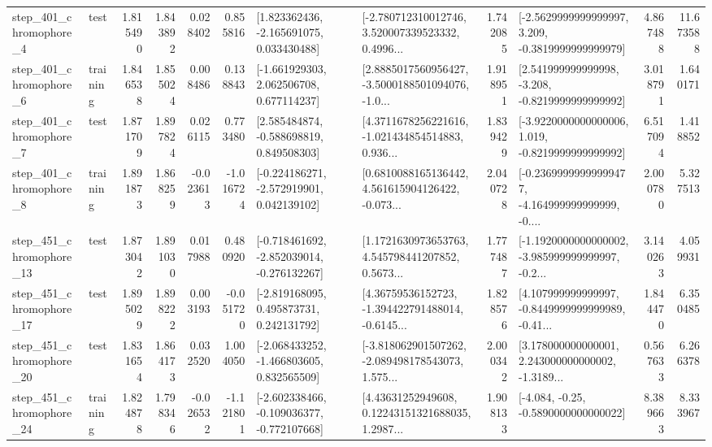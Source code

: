\begin{tabular}{llrrrrllrlrr}
   step\_401\_chromophore\_4 &      test &      1.815490 &    1.843892 &      0.028402 &  0.855816 &    [1.823362436, -2.165691075, 0.033430488] &  [-2.780712310012746, 3.520007339523332, 0.4996... &       1.742085 &  [-2.5629999999999997, 3.209, -0.3819999999999979] &            4.867488 &         11.673588 \\
   step\_401\_chromophore\_6 &  training &      1.846538 &    1.855024 &      0.008486 &  0.138843 &    [-1.661929303, 2.062506708, 0.677114237] &  [2.8885017560956427, -3.5000188501094076, -1.0... &       1.918951 &   [2.541999999999998, -3.208, -0.8219999999999992] &            3.018791 &          1.640171 \\
   step\_401\_chromophore\_7 &      test &      1.871709 &    1.897824 &      0.026115 &  0.773480 &    [2.585484874, -0.588698819, 0.849508303] &  [4.3711678256221616, -1.021434854514883, 0.936... &       1.839429 &  [-3.9220000000000006, 1.019, -0.8219999999999992] &            6.517094 &          1.418852 \\
   step\_401\_chromophore\_8 &  training &      1.891873 &    1.868259 &     -0.023613 & -1.016724 &   [-0.224186271, -2.572919901, 0.042139102] &  [0.6810088165136442, 4.561615904126422, -0.073... &       2.040728 &  [-0.23699999999999477, -4.164999999999999, -0.... &            2.000780 &          5.327513 \\
  step\_451\_chromophore\_13 &      test &      1.873042 &    1.891030 &      0.017988 &  0.480920 &  [-0.718461692, -2.852039014, -0.276132267] &  [1.1721630973653763, 4.545798441207852, 0.5673... &       1.777487 &  [-1.1920000000000002, -3.985999999999997, -0.2... &            3.140263 &          4.059931 \\
  step\_451\_chromophore\_17 &      test &      1.895029 &    1.898222 &      0.003193 & -0.051720 &    [-2.819168095, 0.495873731, 0.242131792] &  [4.36759536152723, -1.394422791488014, -0.6145... &       1.828576 &  [4.107999999999997, -0.8449999999999989, -0.41... &            1.844470 &          6.350485 \\
  step\_451\_chromophore\_20 &      test &      1.831654 &    1.864173 &      0.032520 &  1.004050 &   [-2.068433252, -1.466803605, 0.832565509] &  [-3.818062901507262, -2.089498178543073, 1.575... &       2.000342 &  [3.178000000000001, 2.243000000000002, -1.3189... &            0.567633 &          6.266378 \\
  step\_451\_chromophore\_24 &  training &      1.824878 &    1.798346 &     -0.026532 & -1.121801 &  [-2.602338466, -0.109036377, -0.772107668] &  [4.43631252949608, 0.12243151321688035, 1.2987... &       1.908133 &               [-4.084, -0.25, -0.5890000000000022] &            8.389663 &          8.333967 \\

\end{tabular}

